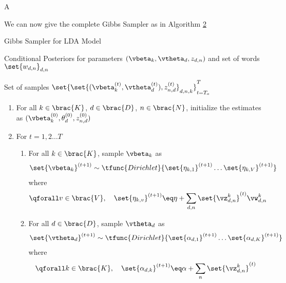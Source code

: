 \documentclass{article}
\begin{document}
\begin{question}
\begin{qpart}{A}
\begin{enumerate}
		\end{enumerate}

		We can now give the complete Gibbs Sampler as in Algorithm \hyperlink{algo:2}{2}

		\begin{algo}[0.9\textwidth]{Gibbs Sampler for LDA Model}

			 \quad Conditional Posteriors for parameters $(\vbeta_k, \vtheta_d, z_{d, n})$ and set of words $\set{w_{d, n}}_{d, n}$ \sbr

			 \quad Set of samples $\set{\set{(\vbeta_k^{(t)}, \vtheta_d^{(t)}), z_{n, d}^{(t)}}_{d, n, k}}_{t = T_o}^T$ \sbr


			\begin{enumerate}[label=\bt{\arabic*.}]
				\item For all $k \in \brac{K}$, $d \in \brac{D}$, $n \in \brac{N}$, initialize the estimates as $(\vbeta_k^{(0)}, \theta_d^{(0)}, z_{n, d}^{(0)})$
				\item For $t = 1, 2 \dots T$ \sbr

					\begin{addmargin}{1.2em}

						\begin{enumerate}[label=\bt{\alph*.}]
							\item For all $k \in \brac{K}$, sample $\vbeta_k$ as
								\begin{align*}
									\set{\vbeta_k}^{(t + 1)} \sim \tfunc{Dirichlet}{\set{\eta_{k, 1}}^{(t + 1)} \dots \set{\eta_{k, V}}^{(t + 1)}}
								\end{align*}
								where
								\begin{align*}
									\qforall v \in \brac{V}, \quad \set{\eta_{k, v}}^{(t + 1)} \eq \eta + \sum_{d, n} \set{\vz_{d, n}^k}^{(t)} \vw_{d, n}^k
								\end{align*}

							\item For all $d \in \brac{D}$, sample $\vtheta_d$ as
								\begin{align*}
									\set{\vtheta_d}^{(t + 1)} \sim \tfunc{Dirichlet}{\set{\alpha_{d, 1}}^{(t + 1)} \dots \set{\alpha_{d, K}}^{(t + 1)}}
								\end{align*}
								where
								\begin{align*}
									\qforall k \in \brac{K}, \quad \set{\alpha_{d, k}}^{(t + 1)} \eq \alpha + \sum_{n} \set{\vz_{d, n}^k}^{(t)}
								\end{align*}


\end{enumerate}
\end{addmargin}
\end{enumerate}
\end{algo}
\end{qpart}
\end{question}
\end{document}
